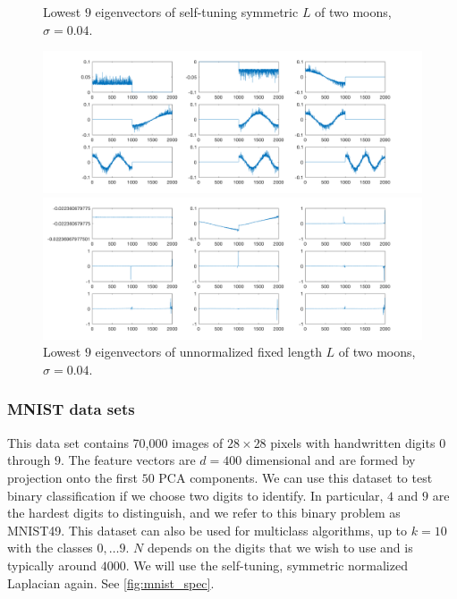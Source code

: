 \documentclass{siamart1116}
\begin{document}
            \begin{figure}[!htb]
                \begin{minipage}{0.48\textwidth}
                    \caption{\label{fig:moon_spec} Lowest $9$ eigenvectors of self-tuning symmetric $L$ of two moons, $\sigma = 0.04$.}
                    \includegraphics[width=\linewidth]{laplacians/moon_laplacian.png}
                \end{minipage}\hfill
                \begin{minipage}{0.48\textwidth}
                    \caption{\label{fig:moon_un_spec} Lowest $9$ eigenvectors of unnormalized fixed length $L$ of two moons, $\sigma = 0.04$.}
                    \includegraphics[width=\linewidth]{laplacians/moon_laplacian_un.png}
                \end{minipage}
            \end{figure}

        \subsubsection{MNIST data sets}
            This data set contains 70,000 images of $28 \times 28$ pixels with handwritten digits $0$ through $9$. The feature vectors are $d=400$ dimensional and are formed by projection onto the first $50$ PCA components. We can use this dataset to test binary classification if we choose two digits to identify. In particular, $4$ and $9$ are the hardest digits to distinguish, and we refer to this binary problem as MNIST49. This dataset can also be used for multiclass algorithms, up to $k=10$ with the classes $0, \ldots 9$. $N$ depends on the digits that we wish to use and is typically around $4000$. We will use the self-tuning, symmetric normalized Laplacian again. See \cref{fig:mnist_spec}.
\end{document}
